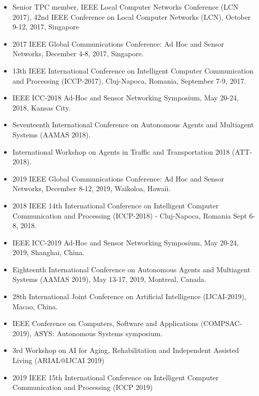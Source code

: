 \begin{itemize}
\item Senior TPC member, IEEE Local Computer Networks Conference (LCN 2017), 42nd IEEE Conference on Local Computer Networks (LCN), October 9-12, 2017, Singapore

\item 2017 IEEE Global Communications Conference: Ad Hoc and Sensor Networks, December 4-8, 2017, Singapore.

\item 13th IEEE International Conference on Intelligent
Computer Communication and Processing (ICCP-2017), Cluj-Napoca, Romania, September 7-9, 2017.

\item IEEE ICC-2018 Ad-Hoc and Sensor Networking Symposium, May 20-24, 2018, Kansas City.

\item Seventeenth International Conference on Autonomous Agents and Multiagent Systems (AAMAS 2018).

\item International Workshop on Agents in Traffic and Transportation
2018 (ATT-2018).

\item  2019 IEEE Global Communications Conference: Ad Hoc and Sensor Networks, December 8-12, 2019, Waikoloa, Hawaii.

\item 2018 IEEE 14th International Conference on Intelligent Computer
Communication and Processing (ICCP-2018) - Cluj-Napoca, Romania Sept 6-8, 2018.

\item IEEE ICC-2019 Ad-Hoc and Sensor Networking Symposium, May 20-24, 2019, Shanghai, China.

\item Eighteenth International Conference on Autonomous Agents and Multiagent Systems (AAMAS 2019), May 13-17, 2019, Montreal, Canada.

\item 28th International Joint Conference on Artificial Intelligence (IJCAI-2019), Macao, China.

\item IEEE Conference on Computers, Software and Applications (COMPSAC-2019), ASYS: Autonomous Systems symposium.

\item 3rd Workshop on AI for Aging, Rehabilitation and Independent
Assisted Living (ARIAL@IJCAI 2019)

\item 2019 IEEE 15th International Conference on Intelligent Computer
Communication and Processing (ICCP 2019)


\end{itemize}
